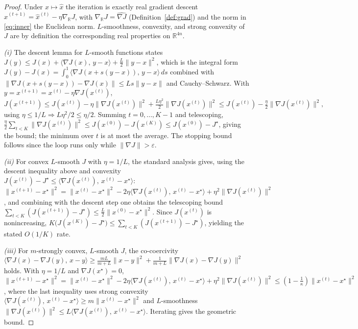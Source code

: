 \documentclass{amsart}
\theoremstyle{definition}
\newcommand{\RR}{\mathbb{R}}
\newcommand{\inner}[2]{\langle #1,\,#2\rangle}
\begin{document}
\begin{proof}
Under $x\mapsto\widehat x$ the iteration is exactly real gradient
descent $\widehat x^{(t+1)}=\widehat x^{(t)}-\eta\nabla_\RR J$, with
$\nabla_\RR J=\widehat{\nabla J}$ (Definition~\ref{def:grad}) and the
norm in \eqref{eq:inner} the Euclidean norm. $L$-smoothness,
convexity, and strong convexity of $J$ are by definition the
corresponding real properties on $\RR^{4n}$.

\emph{(i)} The descent lemma for $L$-smooth functions states
$J(y)\le J(x)+\inner{\nabla J(x)}{y-x}+\tfrac L2\|y-x\|^2$, which is the
integral form
$J(y)-J(x)=\int_0^1\inner{\nabla J(x+s(y-x))}{y-x}\,ds$ combined with
$\|\nabla J(x+s(y-x))-\nabla J(x)\|\le Ls\|y-x\|$ and Cauchy--Schwarz.
With $y=x^{(t+1)}=x^{(t)}-\eta\nabla J(x^{(t)})$,
\[
J(x^{(t+1)})\le J(x^{(t)})-\eta\|\nabla J(x^{(t)})\|^2
+\tfrac{L\eta^2}{2}\|\nabla J(x^{(t)})\|^2
\le J(x^{(t)})-\tfrac\eta2\|\nabla J(x^{(t)})\|^2,
\]
using $\eta\le1/L\Rightarrow L\eta^2/2\le\eta/2$. Summing $t=0,\dots,K-1$
and telescoping,
$\tfrac\eta2\sum_{t<K}\|\nabla J(x^{(t)})\|^2\le J(x^{(0)})-J(x^{(K)})\le
J(x^{(0)})-J^\star$, giving the bound; the minimum over $t$ is at most
the average. The stopping bound follows since the loop runs only while
$\|\nabla J\|>\varepsilon$.

\emph{(ii)} For convex $L$-smooth $J$ with $\eta=1/L$, the standard
analysis gives, using the descent inequality above and convexity
$J(x^{(t)})-J^\star\le\inner{\nabla J(x^{(t)})}{x^{(t)}-x^\star}$:
$\|x^{(t+1)}-x^\star\|^2=\|x^{(t)}-x^\star\|^2
-2\eta\inner{\nabla J(x^{(t)})}{x^{(t)}-x^\star}
+\eta^2\|\nabla J(x^{(t)})\|^2$, and combining with the descent step one
obtains the telescoping bound
$\sum_{t<K}(J(x^{(t+1)})-J^\star)\le\frac{L}{2}\|x^{(0)}-x^\star\|^2$.
Since $J(x^{(t)})$ is nonincreasing, $K\bigl(J(x^{(K)})-J^\star\bigr)\le
\sum_{t<K}(J(x^{(t+1)})-J^\star)$, yielding the stated $O(1/K)$ rate.

\emph{(iii)} For $m$-strongly convex, $L$-smooth $J$, the co-coercivity
$\inner{\nabla J(x)-\nabla J(y)}{x-y}\ge\frac{mL}{m+L}\|x-y\|^2
+\frac1{m+L}\|\nabla J(x)-\nabla J(y)\|^2$ holds. With $\eta=1/L$ and
$\nabla J(x^\star)=0$,
$\|x^{(t+1)}-x^\star\|^2=\|x^{(t)}-x^\star\|^2
-2\eta\inner{\nabla J(x^{(t)})}{x^{(t)}-x^\star}+\eta^2
\|\nabla J(x^{(t)})\|^2\le(1-\tfrac1\kappa)\|x^{(t)}-x^\star\|^2$,
where the last inequality uses strong convexity
$\inner{\nabla J(x^{(t)})}{x^{(t)}-x^\star}\ge m\|x^{(t)}-x^\star\|^2$
and $L$-smoothness
$\|\nabla J(x^{(t)})\|^2\le L\inner{\nabla J(x^{(t)})}{x^{(t)}-x^\star}$.
Iterating gives the geometric bound.
\end{proof}
\end{document}
